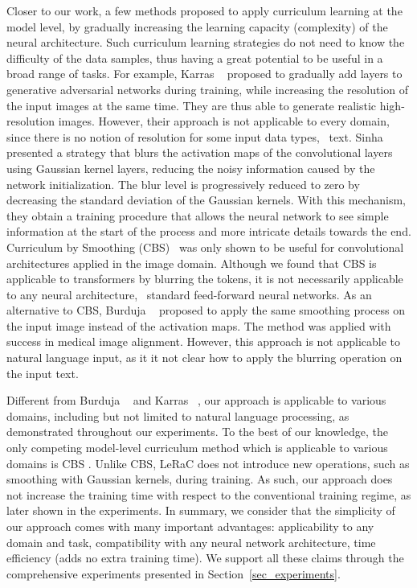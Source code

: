 \documentclass[10pt,twocolumn,letterpaper]{article}
\begin{document}
Closer to our work, a few methods \cite{Karras-ICLR-2018,Sinha-NIPS-2020,Burduja-ICIP-2021} proposed to apply curriculum learning at the model level, by gradually increasing the learning capacity (complexity) of the neural architecture. Such curriculum learning strategies do not need to know the difficulty of the data samples, thus having a great potential to be useful in a broad range of tasks. For example, Karras \etal~\cite{Karras-ICLR-2018} proposed to gradually add layers to generative adversarial networks during training, while increasing the resolution of the input images at the same time. They are thus able to generate realistic high-resolution images. However, their approach is not applicable to every domain, since there is no notion of resolution for some input data types, \eg~text. 
Sinha \etal~\cite{Sinha-NIPS-2020} presented a strategy that blurs the activation maps of the convolutional layers using Gaussian kernel layers, reducing the noisy information caused by the network initialization. The blur level is progressively reduced to zero by decreasing the standard deviation of the Gaussian kernels. With this mechanism, they obtain a training procedure that allows the neural network to see simple information at the start of the process and more intricate details towards the end. Curriculum by Smoothing (CBS)~\cite{Sinha-NIPS-2020} was only shown to be useful for convolutional architectures applied in the image domain. Although we found that CBS is applicable to transformers by blurring the tokens, it is not necessarily applicable to any neural architecture, \eg~standard feed-forward neural networks. As an alternative to CBS, Burduja \etal~\cite{Burduja-ICIP-2021} proposed to apply the same smoothing process on the input image instead of the activation maps. The method was applied with success in medical image alignment. However, this approach is not applicable to natural language input, as it it not clear how to apply the blurring operation on the input text. 

Different from Burduja \etal~\cite{Burduja-ICIP-2021} and Karras \etal~\cite{Karras-ICLR-2018}, our approach is applicable to various domains, including but not limited to natural language processing, as demonstrated throughout our experiments. To the best of our knowledge, the only competing model-level curriculum method which is applicable to various domains is CBS \cite{Sinha-NIPS-2020}. Unlike CBS, LeRaC does not introduce new operations, such as smoothing with Gaussian kernels, during training. As such, our approach does not increase the training time with respect to the conventional training regime, as later shown in the experiments. In summary, we consider that the simplicity of our approach comes with many important advantages: applicability to any domain and task, compatibility with any neural network architecture, time efficiency (adds no extra training time). We support all these claims through the comprehensive experiments presented in Section~\ref{sec_experiments}.
\end{document}
